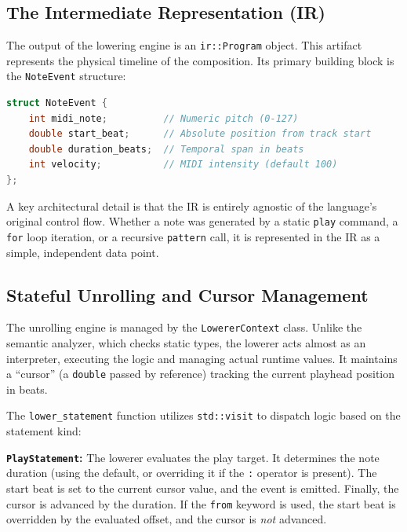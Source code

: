 \subsection{The Intermediate Representation (IR)}\label{detail-subsec:the-intermediate-representation-(ir)}

The output of the lowering engine is an \texttt{ir::Program} object.
This artifact represents the physical timeline of the composition.
Its primary building block is the \texttt{NoteEvent} structure:

\begin{lstlisting}[language=C++, caption={Structure of an atomic IR event.},label={detail-lst:lstlisting2}]
struct NoteEvent {
    int midi_note;          // Numeric pitch (0-127)
    double start_beat;      // Absolute position from track start
    double duration_beats;  // Temporal span in beats
    int velocity;           // MIDI intensity (default 100)
};
\end{lstlisting}

A key architectural detail is that the IR is entirely agnostic of the language's original control flow.
Whether a note was generated by a static \texttt{play} command, a \texttt{for} loop iteration, or a recursive
\texttt{pattern} call, it is represented in the IR as a simple, independent data point.

\subsection{Stateful Unrolling and Cursor Management}\label{detail-subsec:stateful-unrolling-and-cursor-management}

The unrolling engine is managed by the \texttt{LowererContext} class.
Unlike the semantic analyzer, which checks static types, the lowerer acts almost as an interpreter, executing the logic
and managing actual runtime values.
It maintains a ``cursor'' (a \texttt{double} passed by reference) tracking the current playhead position in beats.

The \texttt{lower\_statement} function utilizes \texttt{std::visit} to dispatch logic based on the statement kind:

\noindent \textbf{\texttt{PlayStatement}:} The lowerer evaluates the play target.
It determines the note duration (using the default, or overriding it if the \texttt{:} operator is present).
The start beat is set to the current cursor value, and the event is emitted.
Finally, the cursor is advanced by the duration.
If the \texttt{from} keyword is used, the start beat is overridden by the evaluated offset, and the cursor is
\textit{not} advanced.

